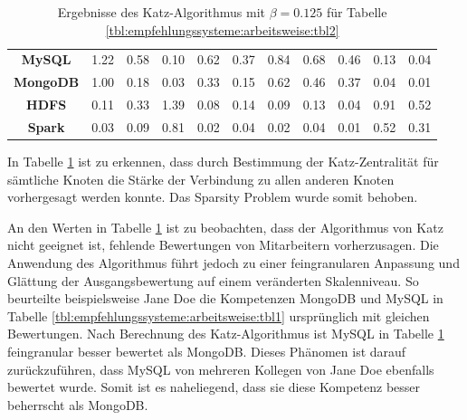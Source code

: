 \begin{table}[h]
\begin{tabular}{c|c|c|c|c|c|c|c|c|c|c}
		\textbf{MySQL}    & 1.22 & 0.58 & 0.10 & 0.62 & 0.37 & 0.84 & 0.68 & 0.46 & 0.13 & 0.04\\
		\textbf{MongoDB}  & 1.00 & 0.18 & 0.03 & 0.33 & 0.15 & 0.62 & 0.46 & 0.37 & 0.04 & 0.01\\
		\textbf{HDFS}     & 0.11 & 0.33 & 1.39 & 0.08 & 0.14 & 0.09 & 0.13 & 0.04 & 0.91 & 0.52\\
		\textbf{Spark}    & 0.03 & 0.09 & 0.81 & 0.02 & 0.04 & 0.02 & 0.04 & 0.01 & 0.52 & 0.31
	\end{tabular}
	\caption{Ergebnisse des Katz-Algorithmus mit $\beta = 0.125$ für Tabelle \ref{tbl:empfehlungssysteme:arbeitsweise:tbl2}}
	\label{tbl:empfehlungssysteme:arbeitsweise:tbl3}
\end{table}

In Tabelle \ref{tbl:empfehlungssysteme:arbeitsweise:tbl3} ist zu erkennen, dass durch Bestimmung der Katz-Zentralität für sämtliche Knoten die Stärke der Verbindung zu allen anderen Knoten vorhergesagt werden konnte. Das Sparsity Problem wurde somit behoben.

An den Werten in Tabelle \ref{tbl:empfehlungssysteme:arbeitsweise:tbl3} ist zu beobachten, dass der Algorithmus von Katz nicht geeignet ist, fehlende Bewertungen von Mitarbeitern vorherzusagen. Die Anwendung des Algorithmus führt jedoch zu einer feingranularen Anpassung und Glättung der Ausgangsbewertung auf einem veränderten Skalenniveau. So beurteilte beispielsweise Jane Doe die Kompetenzen MongoDB und MySQL in Tabelle \ref{tbl:empfehlungssysteme:arbeitsweise:tbl1} ursprünglich mit gleichen Bewertungen. Nach Berechnung des Katz-Algorithmus ist MySQL in Tabelle \ref{tbl:empfehlungssysteme:arbeitsweise:tbl3} feingranular besser bewertet als MongoDB. Dieses Phänomen ist darauf zurückzuführen, dass MySQL von mehreren Kollegen von Jane Doe ebenfalls bewertet wurde. Somit ist es naheliegend, dass sie diese Kompetenz besser beherrscht als MongoDB.

